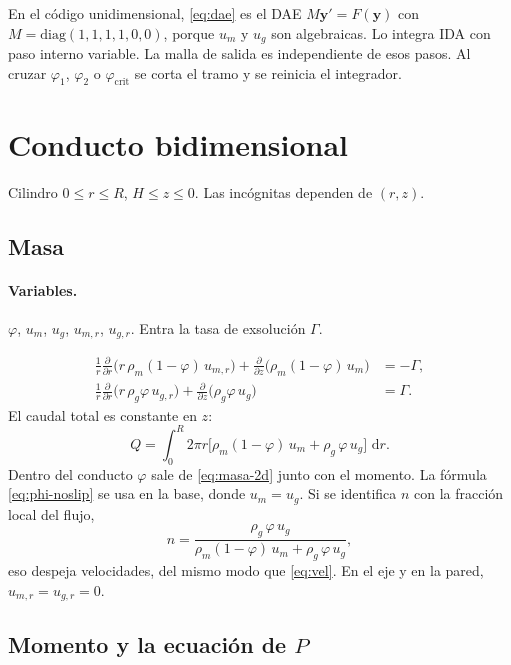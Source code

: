 \documentclass[11pt,a4paper]{article}
\newcommand{\dd}{\,\mathrm{d}}
\newcommand{\p}{\partial}
\begin{document}
En el código unidimensional, \eqref{eq:dae} es el DAE
$M\mathbf{y}'=F(\mathbf{y})$ con
$M=\mathrm{diag}(1,1,1,1,0,0)$, porque $u_m$ y $u_g$ son
algebraicas. Lo integra IDA con paso interno variable. La malla de
salida es independiente de esos pasos. Al cruzar
$\varphi_1$, $\varphi_2$ o $\varphi_{\mathrm{crit}}$ se corta el
tramo y se reinicia el integrador.

\section{Conducto bidimensional}
\label{sec:2d}

Cilindro $0\le r\le R$, $H\le z\le 0$. Las incógnitas dependen de
$(r,z)$.

\subsection{Masa}

\paragraph{Variables.}
$\varphi$, $u_m$, $u_g$, $u_{m,r}$, $u_{g,r}$. Entra la tasa de
exsolución $\Gamma$.

\begin{align}
\label{eq:masa-2d}
\frac{1}{r}\frac{\p}{\p r}\bigl(r\,\rho_m(1-\varphi)\,u_{m,r}\bigr)
+\frac{\p}{\p z}\bigl(\rho_m(1-\varphi)\,u_m\bigr)
&=-\Gamma,
\\
\frac{1}{r}\frac{\p}{\p r}\bigl(r\,\rho_g\varphi\,u_{g,r}\bigr)
+\frac{\p}{\p z}\bigl(\rho_g\varphi\,u_g\bigr)
&=\Gamma.
\end{align}
El caudal total es constante en $z$:
\begin{equation}
\label{eq:Q}
Q
=\int_0^R 2\pi r\bigl[
\rho_m(1-\varphi)\,u_m+\rho_g\,\varphi\,u_g
\bigr]\,\dd r.
\end{equation}
Dentro del conducto $\varphi$ sale de \eqref{eq:masa-2d} junto con
el momento. La fórmula \eqref{eq:phi-noslip} se usa en la base, donde
$u_m=u_g$. Si se identifica $n$ con la fracción local del flujo,
\begin{equation}
\label{eq:n-loc}
n
=\frac{\rho_g\,\varphi\,u_g}
{\rho_m(1-\varphi)\,u_m+\rho_g\,\varphi\,u_g},
\end{equation}
eso despeja velocidades, del mismo modo que \eqref{eq:vel}. En el
eje y en la pared, $u_{m,r}=u_{g,r}=0$.

\subsection{\texorpdfstring{Momento y la ecuación de $P$}{Momento y la ecuación de P}}
\end{document}
